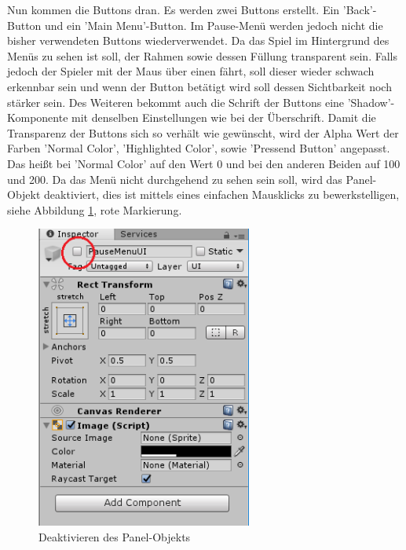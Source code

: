 Nun kommen die Buttons dran. Es werden zwei Buttons erstellt. Ein ’Back’-Button und ein ’Main Menu’-Button.
Im Pause-Menü werden jedoch nicht die bisher verwendeten Buttons wiederverwendet. Da das Spiel im Hintergrund des Menüs zu sehen ist soll, der Rahmen sowie dessen Füllung transparent sein. Falls jedoch der Spieler mit der Maus über einen fährt, soll dieser wieder schwach erkennbar sein und wenn der Button betätigt wird soll dessen Sichtbarkeit noch stärker sein. Des Weiteren bekommt auch die Schrift der Buttons eine ’Shadow’-Komponente mit denselben Einstellungen wie bei der
Überschrift.
Damit die Transparenz der Buttons sich so verhält wie gewünscht, wird der Alpha Wert der Farben ’Normal Color’, ’Highlighted Color’, sowie ’Pressend Button’ angepasst. Das heißt bei ’Normal Color’ auf den Wert 0 und bei den anderen Beiden auf 100 und 200.
Da das Menü nicht durchgehend zu sehen sein soll, wird das Panel-Objekt deaktiviert, dies ist mittels eines einfachen Mausklicks zu bewerkstelligen, siehe Abbildung \ref{deactivatePanel}, rote Markierung.

\begin{figure}[H]
	\includegraphics[height=10cm]{images/deactivatePanel.png}
	\caption{Deaktivieren des Panel-Objekts}
	\label{deactivatePanel}
\end{figure}

